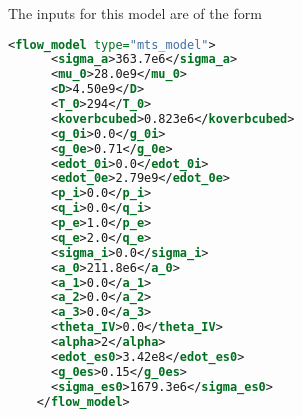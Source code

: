   The inputs for this model are of the form
  \begin{lstlisting}[language=XML]
    <flow_model type="mts_model">
      <sigma_a>363.7e6</sigma_a>
      <mu_0>28.0e9</mu_0>
      <D>4.50e9</D>
      <T_0>294</T_0>
      <koverbcubed>0.823e6</koverbcubed>
      <g_0i>0.0</g_0i>
      <g_0e>0.71</g_0e>
      <edot_0i>0.0</edot_0i>
      <edot_0e>2.79e9</edot_0e>
      <p_i>0.0</p_i>
      <q_i>0.0</q_i>
      <p_e>1.0</p_e>
      <q_e>2.0</q_e>
      <sigma_i>0.0</sigma_i>
      <a_0>211.8e6</a_0>
      <a_1>0.0</a_1>
      <a_2>0.0</a_2>
      <a_3>0.0</a_3>
      <theta_IV>0.0</theta_IV>
      <alpha>2</alpha>
      <edot_es0>3.42e8</edot_es0>
      <g_0es>0.15</g_0es>
      <sigma_es0>1679.3e6</sigma_es0>
    </flow_model>
  \end{lstlisting}

